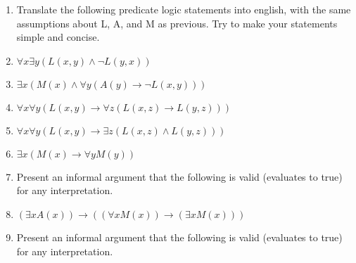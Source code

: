 \documentclass{cs81-homework}
\begin{document}
\begin{enumerate}
\item[] Translate the following predicate logic statements into english, with the
  same assumptions about L, A, and M as previous. Try to make your statements
  simple and concise.
  
\item {} \(\forall x \exists y (L(x, y) \land \lnot L(y, x))\)

  \begin{solution}
  \end{solution}

\item {} \(\exists x (M(x) \land \forall y (A(y) \to  \lnot L(x, y)))\)

  \begin{solution}
  \end{solution}

\item {} \(\forall x \forall y (L(x, y) \to  \forall z (L(x, z) \to  L(y, z)))\)

  \begin{solution}
  \end{solution}

\item {} \(\forall x \forall y (L(x, y) \to  \exists z (L(x, z) \land L (y, z)))\)

  \begin{solution}
  \end{solution}

\item {} \(\exists x (M(x)  \to  \forall y M(y))\)

  \begin{solution}
  \end{solution}

\item[] Present an informal argument that the following is valid (evaluates to
  true) for any interpretation.
  
\item {} \((\exists x A(x)) \to  ((\forall x M(x)) \to  (\exists x M(x)))\)

  \begin{solution}
  \end{solution}

\item[] Present an informal argument that the following is valid (evaluates to
  true) for any interpretation.

  \begin{solution}
  \end{solution}


\end{enumerate}
\end{document}
